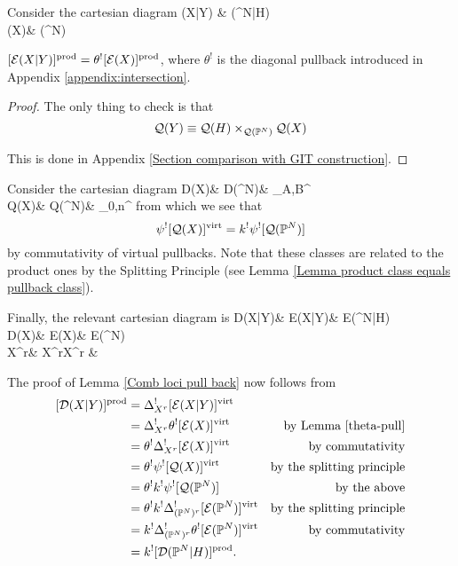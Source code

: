 Consider the cartesian diagram
\bcd
{}(X|Y) \ar[d]\ar[r] & (\PP^N|H)\ar[d,"\theta"] \\
(X)\ar[r] & (\PP^N)
\ecd
\begin{lemma}\label{theta-pull}
 $[\mathcal{E}(X|Y)]^{\operatorname{prod}}=\theta^![\mathcal{E}(X)]^{\operatorname{prod}}$, where $\theta^!$ is the diagonal pullback introduced in Appendix \ref{appendix:intersection}.
\end{lemma}
\begin{proof}
 The only thing to check is that
 \[
 \mathcal Q(Y)\equiv\mathcal Q(H)\times_{\mathcal Q(\mathbb P^N)}\mathcal Q(X)
 \] 
 \begin{comment}
 \[
 \Q{0}{A_0\cup\{q_1\ldots,q_r\}}{Y}{\beta_0} \equiv \Q{0}{A_0\cup\{q_1\ldots,q_r\}}{X}{\beta_0}\times_{\Q{0}{A_0\cup\{q_1\ldots,q_r\}}{\PP^N}{d_0}} \Q{0}{A_0\cup\{q_1\ldots,q_r\}}{H}{d_0}
 \] 
 \end{comment}
 This is done in Appendix \ref{Section comparison with GIT construction}.
\end{proof}

Consider the cartesian diagram
\bcd
\mathcal D(X)\ar[r]\ar[d,"\varphi_X"] & \mathcal D(\PP^N)\ar[r]\ar[d,"\varphi_{\PP^N}"] & \MM_{A,B}^{}\ar[d,"\psi"] \\
\mathcal Q(X)\ar[r,"k"] & \mathcal Q(\PP^N)\ar[r] & \MM_{0,n}^{}
\ecd
from which we see that
\[
 \psi^![\mathcal Q(X)]^{\operatorname{virt}}=k^!\psi^![\mathcal Q(\mathbb P^N)]
\]
by commutativity of virtual pullbacks. Note that these classes are related to the product ones by the Splitting Principle (see Lemma \ref{Lemma product class equals pullback class}).

Finally, the relevant cartesian diagram is
\bcd
\mathcal D(X|Y)\ar[d]\ar[r] & \mathcal E(X|Y)\ar[d]\ar[r] & \mathcal E(\PP^N|H)\ar[d,"\theta"] \\
\mathcal D(X)\ar[d]\ar[r] & \mathcal E(X)\ar[d]\ar[r] & \mathcal E(\PP^N) \\
X^r\ar[r,"\Delta_{X^r}"] & X^r\times X^r & {}
\ecd

The proof of Lemma \ref{Comb loci pull back} now follows from
\begin{align*} [\mathcal D(X|Y)]^{\operatorname{prod}} & = \Delta_{X^r}^! [\mathcal E(X|Y)]^{\operatorname{virt}} & \\
& =  \Delta_{X^r}^! \theta^![\mathcal E(X)]^{\operatorname{virt}} & \text{by Lemma \ref{theta-pull}} \\
& =  \theta^!\Delta_{X^r}^! [\mathcal E(X)]^{\operatorname{virt}} & \text{by commutativity} \\
& =  \theta^!\psi^![\mathcal Q(X)]^{\operatorname{virt}} & \text{by the splitting principle} \\
& =  \theta^!k^!\psi^![\mathcal Q(\mathbb P^N)] & \text{by the above} \\
& =  \theta^!k^!\Delta_{(\mathbb P^N)^r}^![\mathcal E(\mathbb P^N)]^{\operatorname{virt}} & \text{by the splitting principle} \\
& =  k^!\Delta_{(\mathbb P^N)^r}^!\theta^![\mathcal E(\mathbb P^N)]^{\operatorname{virt}} & \text{by commutativity} \\
& =  k^![\mathcal D(\mathbb P^N|H)]^{\operatorname{prod}}.
\end{align*}
 

